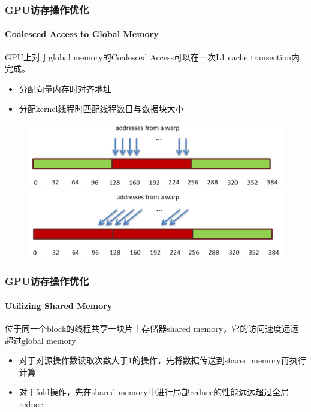 \documentclass{beamer}
\begin{document}
\begin{frame}
  \frametitle{GPU访存操作优化}
  \framesubtitle{Coalesced Access to Global Memory}
  GPU上对于global memory的Coalesced Access可以在一次L1 cache transection内完成。
  \begin{itemize}
    \item 分配向量内存时对齐地址
    \item 分配kernel线程时匹配线程数目与数据块大小
  \end{itemize}
  \begin{figure}
    \includegraphics[scale=0.4]{images/coalesced-access.png}\\
    \includegraphics[scale=0.4]{images/unaligned-sequential-addresses.png}
  \end{figure}
\end{frame}

\begin{frame}
  \frametitle{GPU访存操作优化}
  \framesubtitle{Utilizing Shared Memory}
  位于同一个block的线程共享一块片上存储器shared memory，它的访问速度远远超过global memory
  \begin{itemize}
    \item 对于对源操作数读取次数大于1的操作，先将数据传送到shared memory再执行计算
    \item 对于fold操作，先在shared memory中进行局部reduce的性能远远超过全局reduce
  \end{itemize}
\end{frame}

\end{document}
